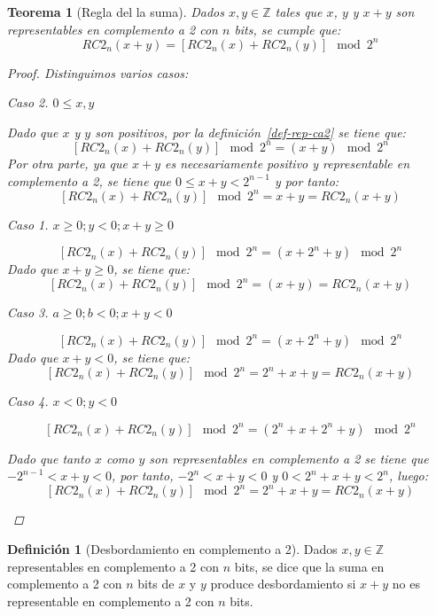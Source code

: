 \documentclass[spanish,a4paper,12pt,titlepage]{article}
\newtheorem{theorem}{Teorema}%
\theoremstyle{definition}
\newtheorem{definition}{Definición}%
\theoremstyle{remark}
\newtheorem{case}{Caso}
\newcommand{\bbZ}{\mathbb{Z}}
\begin{document}
\begin{theorem}[Regla del la suma]\label{theorem-sum-law}
  Dados $x, y \in \bbZ$ tales que $x$, $y$ y $x+y$ son representables en complemento a 2 con $n$ bits, se cumple que:
  \[
    RC2_n(x+y) = [RC2_n(x) + RC2_n(y)] \mod 2^n
  \]
  \begin{proof}
    Distinguimos varios casos:

    \begin{case}
      $0 \le x,y$

      Dado que $x$ y $y$ son positivos, por la definición~\ref{def-rep-ca2} se tiene que:
      \[
        [RC2_n(x)+RC2_n(y)] \mod 2^n = (x + y) \mod 2^n
      \]
      Por otra parte, ya que $x+y$ es necesariamente positivo y representable en complemento a 2, se tiene que $0 \le x + y < 2^{n-1}$ y por tanto:
      \[
        [RC2_n(x)+RC2_n(y)] \mod 2^n = x + y = RC2_n(x+y)
      \]

      \begin{case}
        $x \ge 0; y < 0; x+y \ge 0$
      \end{case}

      \[
        [RC2_n(x)+RC2_n(y)] \mod 2^n = (x + 2^n + y) \mod 2^n
      \]
      Dado que $x+y \ge 0$, se tiene que:
      \[
        [RC2_n(x)+RC2_n(y)] \mod 2^n = (x + y) = RC2_n(x+y)
      \]
    \end{case}
    \begin{case}
      $a \ge 0; b < 0; x+y < 0$

      \[
        [RC2_n(x)+RC2_n(y)] \mod 2^n = (x + 2^n + y) \mod 2^n
      \]
      Dado que $x+y < 0$, se tiene que:
      \[
        [RC2_n(x)+RC2_n(y)] \mod 2^n = 2^n + x + y = RC2_n(x + y)
      \]
    \end{case}

    \begin{case}
      $x < 0; y < 0$

      \[
        [RC2_n(x)+RC2_n(y)] \mod 2^n = (2^n + x + 2^n + y) \mod 2^n
      \]

      Dado que tanto $x$ como $y$ son representables en complemento a 2
      se tiene que $-2^{n-1} < x+y < 0$, por tanto, $-2^n < x+y < 0$
      y $0 < 2^n + x + y < 2^n$, luego:
      \[
        [RC2_n(x)+RC2_n(y)] \mod 2^n = 2^n + x + y = RC2_n(x + y)
      \]
    \end{case}
  \end{proof}
\end{theorem}

\begin{definition}[Desbordamiento en complemento a 2]
  Dados $x, y \in \bbZ$ representables en complemento a 2 con $n$ bits, se dice que la suma en complemento a 2 con $n$ bits de $x$ y $y$ produce desbordamiento si $x+y$ no es representable en complemento a 2 con $n$ bits.
\end{definition}
\end{document}
